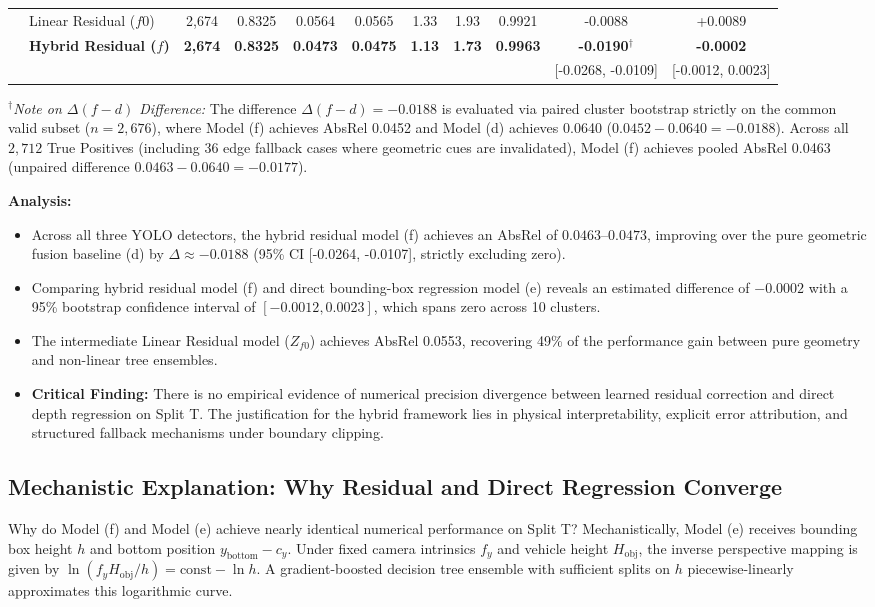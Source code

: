 \documentclass[]{spie}  %
\begin{document}
\begin{table}[htbp]
{\begin{tabular}{llccccccccc}
 & Linear Residual ($f0$) & 2,674 & 0.8325 & 0.0564 & 0.0565 & 1.33 & 1.93 & 0.9921 & -0.0088 & +0.0089 \\
 & \textbf{Hybrid Residual ($f$)} & \textbf{2,674} & \textbf{0.8325} & \textbf{0.0473} & \textbf{0.0475} & \textbf{1.13} & \textbf{1.73} & \textbf{0.9963} & \textbf{-0.0190$^\dagger$} & \textbf{-0.0002} \\
 & & & & & & & & & \footnotesize{[-0.0268, -0.0109]} & \footnotesize{[-0.0012, 0.0023]} \\
\bottomrule
\end{tabular}%
}
\vskip 4pt
\parbox{\textwidth}{\footnotesize $^\dagger$\textit{Note on $\Delta(f - d)$ Difference:} The difference $\Delta(f - d) = -0.0188$ is evaluated via paired cluster bootstrap strictly on the common valid subset ($n = 2,676$), where Model (f) achieves AbsRel 0.0452 and Model (d) achieves 0.0640 ($0.0452 - 0.0640 = -0.0188$). Across all $2,712$ True Positives (including 36 edge fallback cases where geometric cues are invalidated), Model (f) achieves pooled AbsRel 0.0463 (unpaired difference $0.0463 - 0.0640 = -0.0177$).}
\end{table}

\textbf{Analysis:}
\begin{itemize}
    \item Across all three YOLO detectors, the hybrid residual model (f) achieves an AbsRel of $0.0463\text{--}0.0473$, improving over the pure geometric fusion baseline (d) by $\Delta \approx -0.0188$ (95\% CI [-0.0264, -0.0107], strictly excluding zero).
    \item Comparing hybrid residual model (f) and direct bounding-box regression model (e) reveals an estimated difference of $-0.0002$ with a 95\% bootstrap confidence interval of $[-0.0012, 0.0023]$, which spans zero across 10 clusters.
    \item The intermediate Linear Residual model ($Z_{f0}$) achieves AbsRel 0.0553, recovering 49\% of the performance gain between pure geometry and non-linear tree ensembles.
    \item \textbf{Critical Finding:} There is no empirical evidence of numerical precision divergence between learned residual correction and direct depth regression on Split T. The justification for the hybrid framework lies in physical interpretability, explicit error attribution, and structured fallback mechanisms under boundary clipping.
\end{itemize}

\subsection{Mechanistic Explanation: Why Residual and Direct Regression Converge}
Why do Model (f) and Model (e) achieve nearly identical numerical performance on Split T?
Mechanistically, Model (e) receives bounding box height $h$ and bottom position $y_{\text{bottom}} - c_y$. Under fixed camera intrinsics $f_y$ and vehicle height $H_{\text{obj}}$, the inverse perspective mapping is given by $\ln(f_y H_{\text{obj}} / h) = \text{const} - \ln h$. A gradient-boosted decision tree ensemble with sufficient splits on $h$ piecewise-linearly approximates this logarithmic curve.
\end{document}
